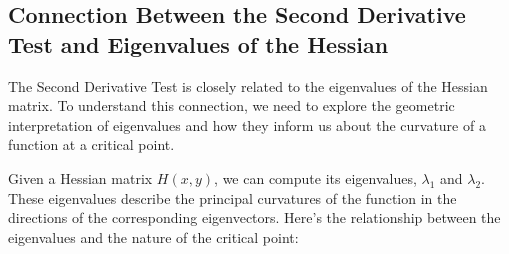\documentclass{report}
\begin{document}
\begin{center}
\end{center}

\subsection{Connection Between the Second Derivative Test and Eigenvalues of the Hessian}

The Second Derivative Test is closely related to the eigenvalues of the Hessian matrix. To understand this connection, we need to explore the geometric interpretation of eigenvalues and how they inform us about the curvature of a function at a critical point.

Given a Hessian matrix \( H(x, y) \), we can compute its eigenvalues, \( \lambda_1 \) and \( \lambda_2 \). These eigenvalues describe the principal curvatures of the function in the directions of the corresponding eigenvectors. Here's the relationship between the eigenvalues and the nature of the critical point:
\end{document}
